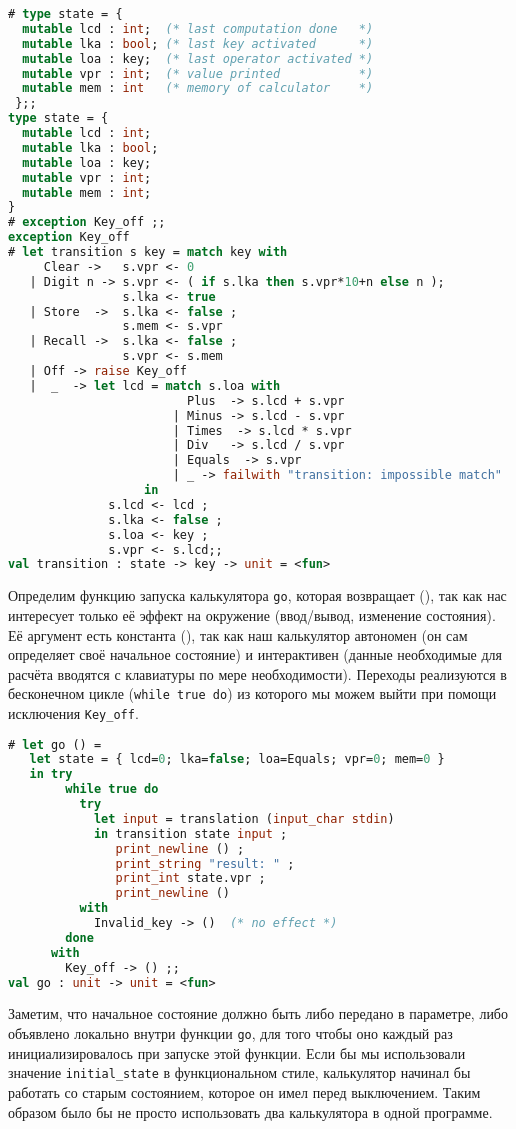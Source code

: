 \begin{lstlisting}[language=OCaml]
# type state = {
  mutable lcd : int;  (* last computation done   *)
  mutable lka : bool; (* last key activated      *)
  mutable loa : key;  (* last operator activated *)
  mutable vpr : int;  (* value printed           *)
  mutable mem : int   (* memory of calculator    *)
 };;
type state = {
  mutable lcd : int;
  mutable lka : bool;
  mutable loa : key;
  mutable vpr : int;
  mutable mem : int;
}
# exception Key_off ;;
exception Key_off
# let transition s key = match key with
     Clear ->   s.vpr <- 0
   | Digit n -> s.vpr <- ( if s.lka then s.vpr*10+n else n );
                s.lka <- true
   | Store  ->  s.lka <- false ;
                s.mem <- s.vpr
   | Recall ->  s.lka <- false ;
                s.vpr <- s.mem
   | Off -> raise Key_off
   |  _  -> let lcd = match s.loa with
                         Plus  -> s.lcd + s.vpr
                       | Minus -> s.lcd - s.vpr
                       | Times  -> s.lcd * s.vpr
                       | Div   -> s.lcd / s.vpr
                       | Equals  -> s.vpr
                       | _ -> failwith "transition: impossible match"
                   in
              s.lcd <- lcd ;
              s.lka <- false ;
              s.loa <- key ;
              s.vpr <- s.lcd;;
val transition : state -> key -> unit = <fun>
\end{lstlisting}

Определим функцию запуска калькулятора \texttt{go}, которая возвращает (), так
как нас интересует только её эффект на окружение (ввод/вывод, изменение
состояния). Её аргумент есть константа (), так как наш калькулятор автономен (он
сам определяет своё начальное состояние) и интерактивен (данные необходимые для
расчёта вводятся с клавиатуры по мере необходимости). Переходы реализуются в
бесконечном цикле (\texttt{while true do}) из которого мы можем выйти при помощи
исключения \texttt{Key\_off}.

\begin{lstlisting}[language=OCaml]
# let go () =
   let state = { lcd=0; lka=false; loa=Equals; vpr=0; mem=0 }
   in try
        while true do
          try
            let input = translation (input_char stdin)
            in transition state input ;
               print_newline () ;
               print_string "result: " ;
               print_int state.vpr ;
               print_newline ()
          with
            Invalid_key -> ()  (* no effect *)
        done
      with
        Key_off -> () ;;
val go : unit -> unit = <fun>
\end{lstlisting}

Заметим, что начальное состояние должно быть либо передано в параметре, либо
объявлено локально внутри функции \texttt{go}, для того чтобы оно каждый раз
инициализировалось при запуске этой функции. Если бы мы использовали значение
\texttt{initial\_state} в функциональном стиле, калькулятор начинал бы работать
со старым состоянием, которое он имел перед выключением. Таким образом было бы
не просто использовать два калькулятора в одной программе.
